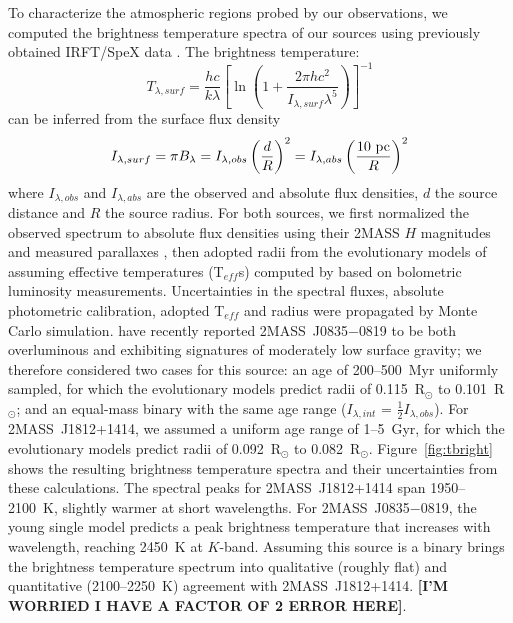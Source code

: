 \documentclass[twocolumn]{aastex6}
\newcommand{\teff}{T$_{eff}$}
\newcommand{\sha}{2MASS~J0835$-$0819}
\newcommand{\shb}{2MASS~J1812+1414}
\begin{document}
To characterize the atmospheric regions probed by our observations, we computed the brightness temperature spectra of our sources using previously obtained IRFT/SpeX data \citep{2008ApJ...686..528L,2010ApJ...710.1142B}. The brightness temperature:
\begin{equation}
T_{\lambda,surf} = \frac{hc}{k\lambda}\left[\ln\left(1+\frac{2\pi{hc^2}}{I_{\lambda,surf}\lambda^5}\right)\right]^{-1}
\end{equation}
can be inferred from the surface flux density
\begin{equation}
I_{\lambda,surf} = {\pi}B_{\lambda} = I_{\lambda,obs}\left(\frac{d}{R}\right)^2 = I_{\lambda,abs}\left(\frac{10~{\rm pc}}{R}\right)^2
\end{equation}
where $I_{\lambda,obs}$ and $I_{\lambda,abs}$ are the observed and absolute flux densities, $d$ the source distance and $R$ the source radius.  For both sources, we first normalized the observed spectrum to absolute flux densities using their 2MASS $H$ magnitudes and measured parallaxes \citep{2016MNRAS.455..357S,2016AJ....152...24W}, then adopted radii from the evolutionary models of \citet{2001RvMP...73..719B} assuming effective temperatures ({\teff}s) computed by \citet{2015ApJ...810..158F} based on bolometric luminosity measurements. Uncertainties in the spectral fluxes, absolute photometric calibration, adopted {\teff} and radius were propagated by Monte Carlo simulation.  \citet{2016ApJ...833...96L} have recently reported {\sha} to be both overluminous and exhibiting signatures of moderately low surface gravity; we therefore considered two cases for this source: an age of 200--500~Myr uniformly sampled, for which the evolutionary models predict radii of 0.115~R$_{\odot}$ to 0.101~R$_{\odot}$; and an equal-mass binary with the same age range ($I_{\lambda,int}$ = $\frac{1}{2}I_{\lambda,obs}$). For {\shb}, we assumed a uniform age range of 1--5~Gyr, for which the evolutionary models predict radii of 0.092~R$_{\odot}$ to 0.082~R$_{\odot}$.  Figure~\ref{fig:tbright} shows the resulting brightness temperature spectra and their uncertainties from these calculations.  The spectral peaks for {\shb} span 1950--2100~K, slightly warmer at short wavelengths. For {\sha}, the young single model predicts a peak brightness temperature that increases with wavelength, reaching 2450~K at $K$-band. Assuming this source is a binary brings the brightness temperature spectrum into qualitative (roughly flat) and quantitative (2100--2250~K) agreement with {\shb}. {\bf [I'M WORRIED I HAVE A FACTOR OF 2 ERROR HERE]}.
\end{document}
